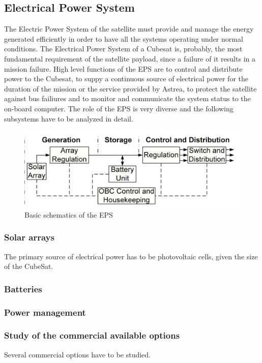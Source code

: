 \subsection{Electrical Power System}

The Electric Power System of the satellite must provide and manage the energy generated efficiently in order to have all the systems operating under normal conditions. The Electrical Power System of a Cubesat is, probably, the most fundamental requirement of the satellite payload, since a failure of it results in a mission failure. High level functions of the EPS are to control and distribute power to the Cubesat, to suppy a continuous source of electrical power for the duration of the mission or the service provided by Astrea, to protect the satellite against bus failiures and to monitor and communicate the system status to the on-board computer. The role of the EPS is very diverse and the following subsystems have to be analyzed in detail.

\begin{figure}[h]
\includegraphics[scale=0.6]{./sections/SatelliteDesign/images/EPSschematics}
\centering
\caption{Basic schematics of the EPS \cite{epsbasics}}
\end{figure}

\subsubsection{Solar arrays}
The primary source of electrical power has to be photovoltaic cells, given the size of the CubeSat. 
\subsubsection{Batteries}
\subsubsection{Power management}

\subsubsection{Study of the commercial available options}
Several commercial options have to be studied.

